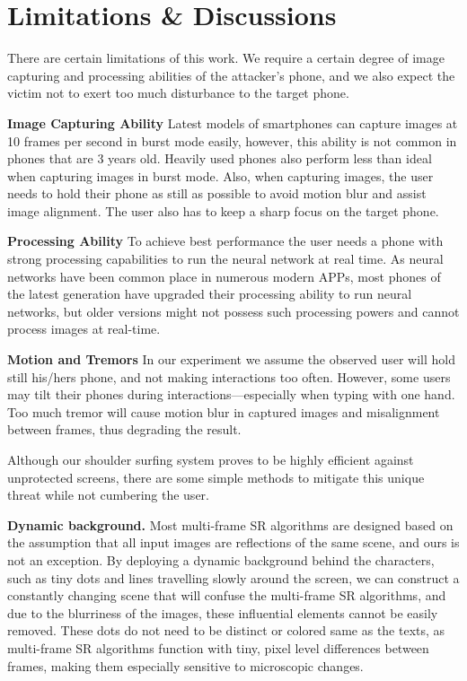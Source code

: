 \section{Limitations \& Discussions}
\label{sec-limitations-and-discussions}
There are certain limitations of this work. We require a certain degree of image capturing and processing abilities of the attacker's phone, and we also expect the victim not to exert too much disturbance to the target phone.

\vspace{1mm}
\noindent
\textbf{Image Capturing Ability}
Latest models of smartphones can capture images at 10 frames per second in burst mode easily, however, this ability is not common in phones that are 3 years old. Heavily used phones also perform less than ideal when capturing images in burst mode. Also, when capturing images, the user needs to hold their phone as still as possible to avoid motion blur and assist image alignment. The user also has to keep a sharp focus on the target phone.

\vspace{1mm}
\noindent
\textbf{Processing Ability}
To achieve best performance the user needs a phone with strong processing capabilities to run the neural network at real time. As neural networks have been common place in numerous modern APPs, most phones of the latest generation have upgraded their processing ability to run neural networks, but older versions might not possess such processing powers and cannot process images at real-time.

\vspace{1mm}
\noindent
\textbf{Motion and Tremors}
In our experiment we assume the observed user will hold still his/hers phone, and not making interactions too often. However, some users may tilt their phones during interactions---especially when typing with one hand. Too much tremor will cause motion blur in captured images and misalignment between frames, thus degrading the result.

Although our shoulder surfing system proves to be highly efficient against unprotected screens, there are some simple methods to mitigate this unique threat while not cumbering the user.

\vspace{1mm}
\noindent
\textbf{Dynamic background.} Most multi-frame SR algorithms are designed based on the assumption that all input images are reflections of the same scene, and ours is not an exception. By deploying a dynamic background behind the characters, such as tiny dots and lines travelling slowly around the screen, we can construct a constantly changing scene that will confuse the multi-frame SR algorithms, and due to the blurriness of the images, these influential elements cannot be easily removed. These dots do not need to be distinct or colored same as the texts, as multi-frame SR algorithms function with tiny, pixel level differences between frames, making them especially sensitive to microscopic changes.

